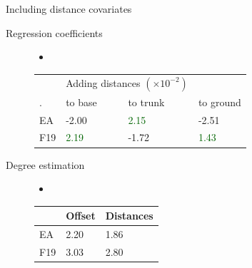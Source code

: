\documentclass{beamer}
\newcommand{\pos}[1]{\textcolor{Darkgreen}{#1}}
\newcommand{\nega}[1]{\textcolor{Nicered}{#1}}
\begin{document}
\begin{frame}{Including distance covariates}
	\begin{description}
	\item[Regression coefficients]\begin{itemize}
	\item []
\end{itemize}%

\begin{table}[]
\begin{tabular}{l|lll}
  & \multicolumn{2}{|c}{Adding distances $(\times 10^{-2})$}   \\\cline{2-4}
   .  & to base & to trunk & to ground \\\hline
EA  &  \nega{-2.00} &\pos{ 2.15  } &  \nega{-2.51  } \\
F19 & \pos{2.19 } &  \nega{-1.72}  & \pos{1.43  } 
\end{tabular}
\end{table}

	\item[Degree estimation]\begin{itemize}
	\item []
\end{itemize} \begin{table}[]
\begin{tabular}{l|ll}
    & Offset & Distances \\\hline
EA  & 2.20   & 1.86      \\
F19 & 3.03   & 2.80     
\end{tabular}
\end{table}
\end{description}
\end{frame}
\end{document}
